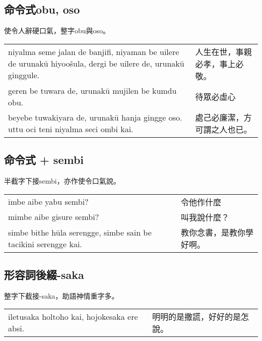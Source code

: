 \documentclass{article}
\begin{document}
\subsection{命令式obu, oso}
\noindent 使令人辭硬口氣，整字obu與oso。
\begin{center}
    \begin{tabularx}{\textwidth}{XX}
        niyalma seme jalan de banjifi, niyaman be uilere de urunak\={u} hiyoo\v{s}ula, dergi be uilere de, urunak\={u} ginggule. & 人生在世，事親必孝，事上必敬。\\
        geren be tuwara de, urunak\={u} mujilen be kumdu obu. & 待眾必虛心\\
        beyebe tuwakiyara de, urunak\={u} hanja gingge oso. uttu oci teni niyalma seci ombi kai. & 處己必廉潔，方可謂之人也已。
    \end{tabularx}
\end{center}

\subsection{命令式 + sembi}
\noindent 半截字下接sembi，亦作使令口氣說。
\begin{center}
    \begin{tabularx}{\textwidth}{XX}
        imbe aibe yabu sembi? & 令他作什麼\\
        mimbe aibe gisure sembi? & 叫我說什麼？\\
        simbe bithe h\={u}la serengge, simbe sain be tacikini serengge kai. &教你念書，是教你學好啊。
    \end{tabularx}
\end{center}

\subsection{形容詞後綴-saka}
\noindent 整字下截接-saka，助語神情重字多。
\begin{center}
    \begin{tabularx}{\textwidth}{XX}
        iletusaka holtoho kai, hojokesaka ere absi. & 明明的是撒謊，好好的是怎說。
    \end{tabularx}
\end{center}
\end{document}
